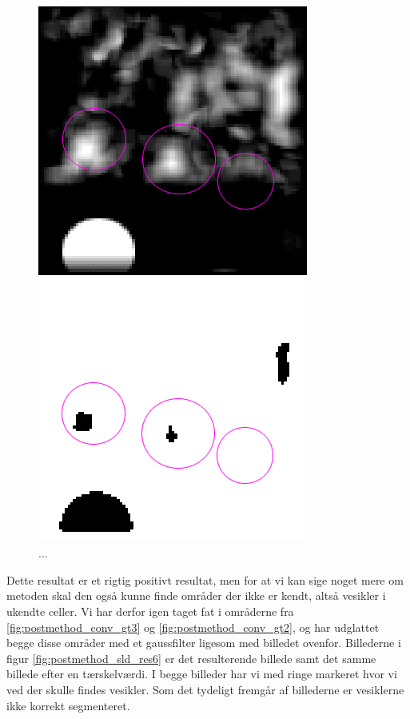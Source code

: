 \begin{figure}[H]
	\begin{minipage}[b]{0.5\linewidth}
		\centering
		\includegraphics[scale=0.54]{files/postmethod/img/sld_res5.png}
	\end{minipage}
	\hspace{0.8cm}
	\begin{minipage}[b]{0.5\linewidth}
		\centering
		\includegraphics[scale=0.54]{files/postmethod/img/sld_res6.png}
	\end{minipage}
	\caption{...\label{fig:postmethod_sld_res5}}
\end{figure}

Dette resultat er et rigtig positivt resultat, men for at vi kan sige noget mere om metoden skal den også kunne finde områder der ikke er kendt, altså vesikler i ukendte celler. Vi har derfor igen taget fat i områderne fra \ref{fig:postmethod_conv_gt3} og \ref{fig:postmethod_conv_gt2}, og har udglattet begge disse områder med et gaussfilter ligesom med billedet ovenfor. Billederne i figur \ref{fig:postmethod_sld_res6} er det resulterende billede samt det samme billede efter en tærskelværdi. I begge billeder har vi med ringe markeret hvor vi ved der skulle findes vesikler. Som det tydeligt fremgår af billederne er vesiklerne ikke korrekt segmenteret.

